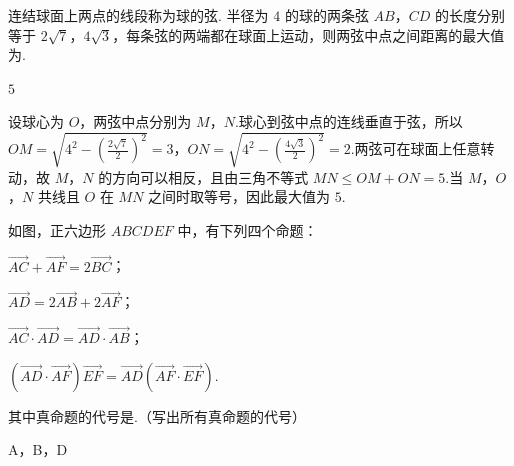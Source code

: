 \begin{problem}
连结球面上两点的线段称为球的弦. 半径为 \(4\) 的球的两条弦 \(AB\)，\(CD\) 的长度分别等于 \(2\sqrt{7}\)，\(4\sqrt{3}\)，每条弦的两端都在球面上运动，则两弦中点之间距离的最大值为\fillinblank{}.
\end{problem}

\begin{answer}
\(5\)
\end{answer}

\begin{solution}
设球心为 \(O\)，两弦中点分别为 \(M\)，\(N\).球心到弦中点的连线垂直于弦，所以
\(OM=\sqrt{4^2-\left(\frac{2\sqrt7}{2}\right)^2}=3\)，\(ON=\sqrt{4^2-\left(\frac{4\sqrt3}{2}\right)^2}=2\).两弦可在球面上任意转动，故 \(M\)，\(N\) 的方向可以相反，且由三角不等式 \(MN\leqslant OM+ON=5\).当 \(M\)，\(O\)，\(N\) 共线且 \(O\) 在 \(MN\) 之间时取等号，因此最大值为 \(5\).
\end{solution}

\begin{problem}
如图，正六边形 \(ABCDEF\) 中，有下列四个命题：
\begin{circlelist}
\item \(\overrightarrow{AC} + \overrightarrow{AF} = 2\overrightarrow{BC}\)；
\item \(\overrightarrow{AD} = 2\overrightarrow{AB} + 2\overrightarrow{AF}\)；
\item \(\overrightarrow{AC} \cdot \overrightarrow{AD} = \overrightarrow{AD} \cdot \overrightarrow{AB}\)；
\item \((\overrightarrow{AD} \cdot \overrightarrow{AF})\overrightarrow{EF} = \overrightarrow{AD}(\overrightarrow{AF} \cdot \overrightarrow{EF})\).
\end{circlelist}
其中真命题的代号是\fillinblank{}.（写出所有真命题的代号）

\end{problem}

\begin{answer}
A，B，D
\end{answer}

